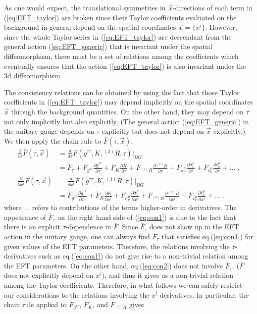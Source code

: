 \documentclass[a4paper,11pt]{article}
\numberwithin{equation}{section}
\begin{document}
As one would expect, the translational symmetries in $\vec{x}$-directions of each term in (\ref{eq:EFT_taylor}) are broken since their Taylor coefficients evaluated on the background in general depend on the spatial coordinates $\vec{x} = \{x^i\}$. However, since the whole Taylor series in (\ref{eq:EFT_taylor}) are descendant from the general action (\ref{eq:EFT_generic}) that is invariant under the spatial diffeomorphism, there must be a set of relations among the coefficients which eventually ensures that the action (\ref{eq:EFT_taylor}) is also invariant under the 3d diffeomorphism.

The consistency relations can be obtained by using the fact that those Taylor coefficients in (\ref{eq:EFT_taylor}) may depend implicitly on the spatial coordinates $\vec{x}$ through the background quantities. On the other hand, they may depend on $\tau$ not only implicitly but also explicitly. (The general action (\ref{eq:EFT_generic}) in the unitary gauge depends on $\tau$ explicitly but does not depend on $\vec{x}$ explicitly.) We then apply the chain rule to $\bar{F}(\tau,\vec{x})$,
\begin{align}
\frac{\partial}{\partial\tau}\bar{F}(\tau,\vec{x}) &= \frac{d}{d\tau} F(g^{\tau\tau},K,{}^{(3)}\!R,\tau) \bigg|_{BG} \nonumber \\
&= \bar{F}_{\tau} + \bar{F}_{g^{\tau\tau}}\frac{\partial \bar{g}^{\tau\tau}}{\partial\tau} + \bar{F}_{K}\frac{\partial \bar{K}}{\partial\tau} + \bar{F}_{{}^{(3)}\!R} \frac{\partial {}^{(3)}\!\bar{R}}{\partial\tau}+ \bar{F}_{\sigma^\mu_\nu} \frac{\partial \bar{\sigma}^\mu_\nu}{\partial\tau} + \bar{F}_{r^\mu_\nu} \frac{\partial \bar{r}^\mu_\nu}{\partial\tau}  + \ldots \label{eq:con1}\;, \\
\frac{\partial}{\partial x^i}\bar{F}(\tau,\vec{x}) &= \frac{d}{dx^i} F(g^{\tau\tau},K,{}^{(3)}\!R,\tau) \bigg|_{BG} \nonumber \\
&= \bar{F}_{g^{\tau\tau}}\frac{\partial \bar{g}^{\tau\tau}}{\partial x^i} + \bar{F}_{K}\frac{\partial \bar{K}}{\partial x^i} + \bar{F}_{\sigma^\mu_\nu} \frac{\partial \bar{\sigma}^\mu_\nu}{\partial x^i} + \bar{F}_{{}^{(3)}\!R} \frac{\partial {}^{(3)}\!\bar{R}}{\partial x^i} + \bar{F}_{r^\mu_\nu} \frac{\partial \bar{r}^\mu_\nu}{\partial x^i} + \ldots \label{eq:con2}\;,
\end{align}
where $\ldots$ refers to contributions of the terms higher-order in derivatives. The appearance of $\bar{F}_{\tau}$ on the right hand side of (\ref{eq:con1}) is due to the fact that there is an explicit $\tau$-dependence in $\bar{F}$. Since $\bar{F}_{\tau}$ does not show up in the EFT action in the unitary gauge, one can always find $\bar{F}_{\tau}$ that satisfies eq.(\ref{eq:con1}) for given values of the EFT parameters. Therefore, the relations involving the $\tau$-derivatives such as eq.(\ref{eq:con1}) do not give rise to a non-trivial relation among the EFT parameters. On the other hand, eq.(\ref{eq:con2}) does not involve $\bar{F}_{x^i}$ ($\bar{F}$ does not explicitly depend on $x^i$), and thus it gives us a non-trivial relation among the Taylor coefficients. Therefore, in what follows we can safely restrict our considerations to the relations involving the $x^i$-derivatives. In particular, the chain rule applied to $\bar{F}_{g^{\tau\tau}}$, $\bar{F}_{K}$, and $\bar{F}_{{}^{(3)}\!R}$ gives
\end{document}
